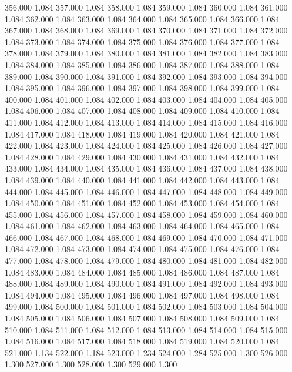 356.000 1.084 
357.000 1.084 
358.000 1.084 
359.000 1.084 
360.000 1.084 
361.000 1.084 
362.000 1.084 
363.000 1.084 
364.000 1.084 
365.000 1.084 
366.000 1.084 
367.000 1.084 
368.000 1.084 
369.000 1.084 
370.000 1.084 
371.000 1.084 
372.000 1.084 
373.000 1.084 
374.000 1.084 
375.000 1.084 
376.000 1.084 
377.000 1.084 
378.000 1.084 
379.000 1.084 
380.000 1.084 
381.000 1.084 
382.000 1.084 
383.000 1.084 
384.000 1.084 
385.000 1.084 
386.000 1.084 
387.000 1.084 
388.000 1.084 
389.000 1.084 
390.000 1.084 
391.000 1.084 
392.000 1.084 
393.000 1.084 
394.000 1.084 
395.000 1.084 
396.000 1.084 
397.000 1.084 
398.000 1.084 
399.000 1.084 
400.000 1.084 
401.000 1.084 
402.000 1.084 
403.000 1.084 
404.000 1.084 
405.000 1.084 
406.000 1.084 
407.000 1.084 
408.000 1.084 
409.000 1.084 
410.000 1.084 
411.000 1.084 
412.000 1.084 
413.000 1.084 
414.000 1.084 
415.000 1.084 
416.000 1.084 
417.000 1.084 
418.000 1.084 
419.000 1.084 
420.000 1.084 
421.000 1.084 
422.000 1.084 
423.000 1.084 
424.000 1.084 
425.000 1.084 
426.000 1.084 
427.000 1.084 
428.000 1.084 
429.000 1.084 
430.000 1.084 
431.000 1.084 
432.000 1.084 
433.000 1.084 
434.000 1.084 
435.000 1.084 
436.000 1.084 
437.000 1.084 
438.000 1.084 
439.000 1.084 
440.000 1.084 
441.000 1.084 
442.000 1.084 
443.000 1.084 
444.000 1.084 
445.000 1.084 
446.000 1.084 
447.000 1.084 
448.000 1.084 
449.000 1.084 
450.000 1.084 
451.000 1.084 
452.000 1.084 
453.000 1.084 
454.000 1.084 
455.000 1.084 
456.000 1.084 
457.000 1.084 
458.000 1.084 
459.000 1.084 
460.000 1.084 
461.000 1.084 
462.000 1.084 
463.000 1.084 
464.000 1.084 
465.000 1.084 
466.000 1.084 
467.000 1.084 
468.000 1.084 
469.000 1.084 
470.000 1.084 
471.000 1.084 
472.000 1.084 
473.000 1.084 
474.000 1.084 
475.000 1.084 
476.000 1.084 
477.000 1.084 
478.000 1.084 
479.000 1.084 
480.000 1.084 
481.000 1.084 
482.000 1.084 
483.000 1.084 
484.000 1.084 
485.000 1.084 
486.000 1.084 
487.000 1.084 
488.000 1.084 
489.000 1.084 
490.000 1.084 
491.000 1.084 
492.000 1.084 
493.000 1.084 
494.000 1.084 
495.000 1.084 
496.000 1.084 
497.000 1.084 
498.000 1.084 
499.000 1.084 
500.000 1.084 
501.000 1.084 
502.000 1.084 
503.000 1.084 
504.000 1.084 
505.000 1.084 
506.000 1.084 
507.000 1.084 
508.000 1.084 
509.000 1.084 
510.000 1.084 
511.000 1.084 
512.000 1.084 
513.000 1.084 
514.000 1.084 
515.000 1.084 
516.000 1.084 
517.000 1.084 
518.000 1.084 
519.000 1.084 
520.000 1.084 
521.000 1.134 
522.000 1.184 
523.000 1.234 
524.000 1.284 
525.000 1.300 
526.000 1.300 
527.000 1.300 
528.000 1.300 
529.000 1.300 
